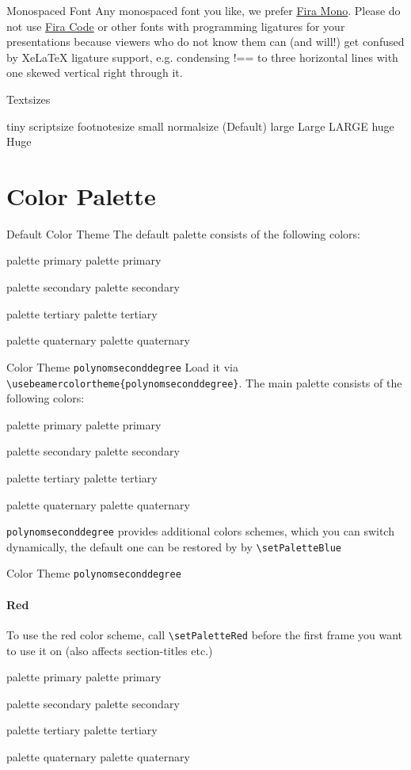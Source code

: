 \documentclass[fragile=singleslide]{beamer}
\begin{document}
\begin{frame}{Monospaced Font}
  Any monospaced font you like, we prefer
  \href{https://mozilla.github.io/Fira/}{Fira Mono}. Please do not use
  \href{https://github.com/tonsky/FiraCode}{Fira Code} or other fonts with 
  programming ligatures for your presentations because viewers who do not 
  know them can (and will!) get confused by XeLaTeX ligature support, e.g.
  condensing !== to three horizontal lines with one skewed vertical right 
  through it.
\end{frame}
 
\begin{frame}{Textsizes}
  
  {\tiny tiny}
  {\scriptsize scriptsize}
  {\footnotesize footnotesize}
  {\small small}
  {\normalsize normalsize} (Default)
  {\large large}
  {\Large Large}
  {\LARGE LARGE}
  {\huge huge}
  {\Huge Huge}
\end{frame}

\section{Color Palette}

\newcommand{\clrbx}[1]{
  \begin{beamercolorbox}[wd=5em,ht=5ex,dp=1.125ex,center]{#1}
    \small#1
  \end{beamercolorbox}}
\newcommand{\paletteColors}{
  \clrbx{palette primary}
  \clrbx{palette secondary}
  \clrbx{palette tertiary}
  \clrbx{palette quaternary}}


\begin{frame}{Default Color Theme}
  The default palette consists of the following colors:\\
  \paletteColors
\end{frame}



\begin{frame}[fragile=singleslide]{Color Theme \texttt{polynomseconddegree}}
  Load it via \verb|\usebeamercolortheme{polynomseconddegree}|. 
  The main palette consists of the following colors:\\
  \paletteColors
  
  \texttt{polynomseconddegree} provides additional colors schemes,
  which you can switch dynamically, the default one can be restored by by
  \verb|\setPaletteBlue|
\end{frame}

\setPaletteRed
\begin{frame}[fragile=singleslide]{Color Theme \texttt{polynomseconddegree}}
  \framesubtitle{Red}

  To use the red color scheme, call \verb|\setPaletteRed|
  before the first frame you want to use it on (also affects
  section-titles etc.)\\
  \paletteColors
  
\end{frame}
\end{document}
